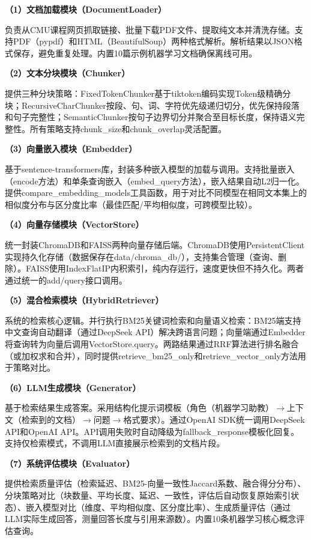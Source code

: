 \documentclass[10pt,a4paper]{article}
\begin{document}
\textbf{（1）文档加载模块（DocumentLoader）}

负责从CMU课程网页抓取链接、批量下载PDF文件、提取纯文本并清洗存储。支持PDF（pypdf）和HTML（BeautifulSoup）两种格式解析。解析结果以JSON格式保存，避免重复处理。内置10篇示例机器学习文档确保离线可用。

\textbf{（2）文本分块模块（Chunker）}

提供三种分块策略：FixedTokenChunker基于tiktoken编码实现Token级精确分块；RecursiveCharChunker按段、句、词、字符优先级递归切分，优先保持段落和句子完整性；SemanticChunker按句子边界切分并聚合至目标长度，保持语义完整性。所有策略支持chunk\_size和chunk\_overlap灵活配置。

\textbf{（3）向量嵌入模块（Embedder）}

基于sentence-transformers库，封装多种嵌入模型的加载与调用。支持批量嵌入（encode方法）和单条查询嵌入（embed\_query方法），嵌入结果自动L2归一化。提供compare\_embedding\_models工具函数，用于对比不同模型在相同文本集上的相似度分布与区分度比率（最佳匹配/平均相似度，可跨模型比较）。

\textbf{（4）向量存储模块（VectorStore）}

统一封装ChromaDB和FAISS两种向量存储后端。ChromaDB使用PersistentClient实现持久化存储（数据保存在data/chroma\_db/），支持集合管理（查询、删除）。FAISS使用IndexFlatIP内积索引，纯内存运行，速度更快但不持久化。两者通过统一的add/query接口调用。

\textbf{（5）混合检索模块（HybridRetriever）}

系统的检索核心逻辑。并行执行BM25关键词检索和向量语义检索：BM25端支持中文查询自动翻译（通过DeepSeek API）解决跨语言问题；向量端通过Embedder将查询转为向量后调用VectorStore.query。两路结果通过RRF算法进行排名融合（或加权求和合并），同时提供retrieve\_bm25\_only和retrieve\_vector\_only方法用于策略对比。

\textbf{（6）LLM生成模块（Generator）}

基于检索结果生成答案。采用结构化提示词模板（角色（机器学习助教）$\to$上下文（检索到的文档）$\to$问题$\to$格式要求）。通过OpenAI SDK统一调用DeepSeek API和OpenAI API。API调用失败时自动降级为fallback\_response模板化回复。支持仅检索模式，不调用LLM直接展示检索到的文档片段。

\textbf{（7）系统评估模块（Evaluator）}

提供检索质量评估（检索延迟、BM25-向量一致性Jaccard系数、融合得分分布）、分块策略对比（块数量、平均长度、延迟、一致性，评估后自动恢复原始索引状态）、嵌入模型对比（维度、平均相似度、区分度比率）、生成质量评估（通过LLM实际生成回答，测量回答长度与引用来源数）。内置10条机器学习核心概念评估查询。
\end{document}
